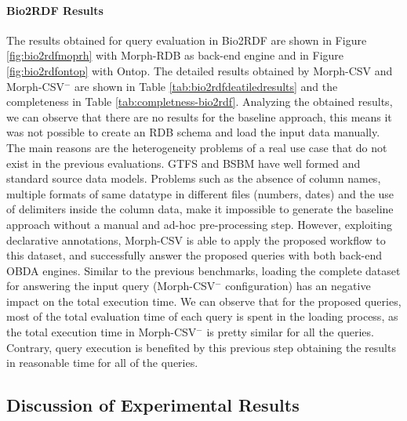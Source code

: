\noindent\paragraph*{\textbf{Bio2RDF Results}}
The results obtained for query evaluation in Bio2RDF are shown in Figure \ref{fig:bio2rdfmoprh} with Morph-RDB as back-end engine and in Figure \ref{fig:bio2rdfontop} with Ontop. The detailed results obtained by Morph-CSV and Morph-CSV$^-$ are shown in Table \ref{tab:bio2rdfdeatiledresults} and the completeness in Table \ref{tab:completness-bio2rdf}. Analyzing the obtained results, we can observe that there are no results for the baseline approach, this means it was not possible to create an RDB schema and load the input data manually. The main reasons are the heterogeneity problems of a real use case that do not exist in the previous evaluations. GTFS and BSBM have well formed and standard source data models. Problems such as the absence of column names, multiple formats of same datatype in different files (numbers, dates) and the use of delimiters inside the column data, make it impossible to generate the baseline approach without a manual and ad-hoc pre-processing step. However, exploiting declarative annotations, Morph-CSV is able to apply the proposed workflow to this dataset, and successfully answer the proposed queries with both back-end OBDA engines. Similar to the previous benchmarks, loading the complete dataset for answering the input query (Morph-CSV$^-$ configuration) has an negative impact on the total execution time. We can observe that for the proposed queries, most of the total evaluation time of each query is spent in the loading process, as the total execution time in Morph-CSV$^-$ is pretty similar for all the queries. Contrary, query execution is benefited by this previous step obtaining the results in reasonable time for all of the queries. 


\subsection{Discussion of Experimental Results}

